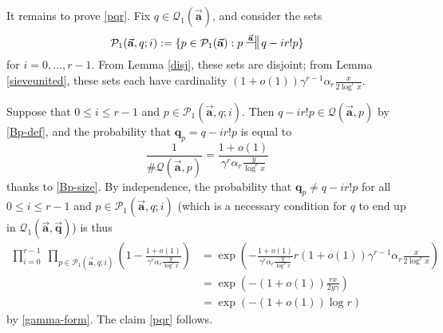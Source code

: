 \documentclass[11pt]{amsart}
\numberwithin{equation}{section}  %
\theoremstyle{remark}
\theoremstyle{plain}
\numberwithin{equation}{section}
\renewcommand{\leq}{\leqslant}
\renewcommand{\(}{\left(}
\renewcommand{\)}{\right)}
\newcommand{\relra}{\nsdtstile{}{\vect{\mathbf{a}}}} %
\newcommand{\vect}[1]{{\ensuremath{\vec{#1}}}}
\newcommand{\PP}{\mathcal{P}}
\newcommand{\QQ}{\mathcal{Q}}
\begin{document}
It remains to prove \eqref{pqr}.  Fix $q \in \QQ_1(\vect{\mathbf{a}})$, and consider the sets
$$ \PP_1(\vect{\mathbf{a}},q; i) := \{ p \in \PP_1(\vect{\mathbf{a}}):  p \relra q - ir! p \}$$
for $i=0,\dots,r-1$.  From Lemma \ref{disj}, these sets are disjoint; from Lemma \ref{sieveunited}, these sets each have cardinality $(1+o(1)) \gamma^{r-1} \alpha_r \frac{x}{2\log^r x}$.

Suppose that $0 \leq i \leq r-1$ and $p \in \PP_1(\vect{\mathbf{a}},q;
i)$.  Then $q-ir! p \in \QQ(\vect{\mathbf{a}},p)$ by \eqref{Bp-def},
and the probability that $\mathbf{q}_p=q-ir!p$ is equal to
$$  \frac{1}{\# \QQ(\vect{\mathbf{a}}, p)} = \frac{1+o(1)}{\gamma^r\alpha_r\frac y{\log^r x} }$$
thanks to \eqref{Bp-size}. By independence, the probability that $\mathbf{q}_p \neq q-ir!p$ for all $0 \leq i \leq r-1$ and $p \in \PP_1(\vect{\mathbf{a}},q;i)$ (which is a necessary condition for $q$ to end up in $\QQ_1(\vect{\mathbf{a}}, \vect{\mathbf{q}})$) is thus
\begin{align*}
 \prod_{i=0}^{r-1} \; \prod_{p \in \PP_1(\vect{\mathbf{a}},q; i)}\left( 1 - \frac{1+o(1)}{\gamma^{r} \alpha_r \frac{y}{\log^r x} } \right)
&= \exp\left( - \frac{1+o(1)}{\gamma^{r} \alpha_r \frac{y}{\log^r x} } r (1+o(1)) \gamma^{r-1}\alpha_r\frac x{2\log^r x} \right) \\
&= \exp\left( - (1+o(1)) \frac{rx}{2y\gamma} \right ) \\
&= \exp( - (1+o(1)) \log r )
\end{align*}
by \eqref{gamma-form}.  The claim \eqref{pqr} follows.
\end{document}
